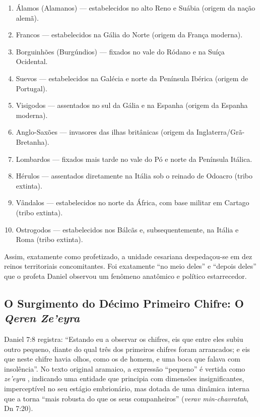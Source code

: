 \begin{enumerate}
  \item Álamos (Alamanos) — estabelecidos no alto Reno e Suábia (origem da nação alemã).
  \item Francos — estabelecidos na Gália do Norte (origem da França moderna).
  \item Borguinhões (Burgúndios) — fixados no vale do Ródano e na Suíça Ocidental.
  \item Suevos — estabelecidos na Galécia e norte da Península Ibérica (origem de Portugal).
  \item Visigodos — assentados no sul da Gália e na Espanha (origem da Espanha moderna).
  \item Anglo-Saxões — invasores das ilhas britânicas (origem da Inglaterra/Grã-Bretanha).
  \item Lombardos — fixados mais tarde no vale do Pó e norte da Península Itálica.
  \item Hérulos — assentados diretamente na Itália sob o reinado de Odoacro (tribo extinta).
  \item Vândalos — estabelecidos no norte da África, com base militar em Cartago (tribo extinta).
  \item Ostrogodos — estabelecidos nos Bálcãs e, subsequentemente, na Itália e Roma (tribo extinta).
\end{enumerate}


Assim, exatamente como profetizado, a unidade cesariana despedaçou-se em dez reinos territoriais concomitantes. Foi exatamente ``no meio deles'' e ``depois deles'' que o profeta Daniel observou um fenômeno anatômico e político estarrecedor.



\subsection{O Surgimento do Décimo Primeiro Chifre: O \textit{Qeren Ze’eyra}}


Daniel 7:8 registra: ``Estando eu a observar os chifres, eis que entre eles subiu outro pequeno, diante do qual três dos primeiros chifres foram arrancados; e eis que neste chifre havia olhos, como os de homem, e uma boca que falava com insolência''. No texto original aramaico, a expressão ``pequeno'' é vertida como \textit{ze'eyra} , indicando uma entidade que principia com dimensões insignificantes, imperceptível no seu estágio embrionário, mas dotada de uma dinâmica interna que a torna ``mais robusta do que os seus companheiros'' (\textit{verav min-chavratah}, Dn 7:20).


